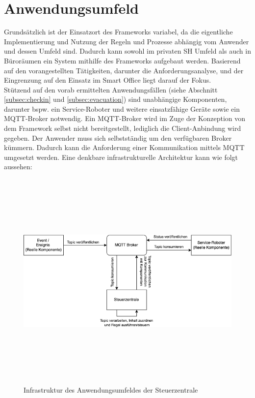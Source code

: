 \section{Anwendungsumfeld}
\label{sec:anwendungsumfeld}
    Grundsätzlich ist der Einsatzort des Frameworks variabel, da die eigentliche Implementierung und Nutzung der Regeln und Prozesse 
    abhängig vom Anwender und dessen Umfeld sind. Dadurch kann sowohl im privaten \acl{SH} Umfeld als auch in Büroräumen ein System mithilfe des 
    Frameworks aufgebaut werden. Basierend auf den vorangestellten Tätigkeiten, darunter die Anforderungsanalyse, und der Eingrenzung auf den 
    Einsatz im Smart Office liegt darauf der Fokus. %
    \\
    \linebreak
    Stützend auf den vorab ermittelten Anwendungsfällen (siehe Abschnitt \ref{subsec:checkin} und \ref{subsec:evacuation}) sind unabhängige 
    Komponenten, darunter bspw. ein Service-Roboter und weitere einsatzfähige Geräte sowie ein \acs{MQTT}-Broker notwendig. Ein \acs{MQTT}-Broker 
    wird im Zuge der Konzeption von dem Framework selbst nicht bereitgestellt, lediglich die Client-Anbindung wird gegeben. Der Anwender muss sich selbstständig um den verfügbaren Broker kümmern. 
    Dadurch kann die Anforderung einer Kommunikation mittels \acs{MQTT} umgesetzt werden. Eine denkbare infrastrukturelle 
    Architektur kann wie folgt aussehen: 
    \begin{figure}[hbt!]
        \centering
        \includegraphics[width=14cm,height=11cm,keepaspectratio]{images/Systemarchitektur.png}
        \caption{Infrastruktur des Anwendungsumfeldes der Steuerzentrale}
        \label{fig:infrastructure}
    \end{figure}


